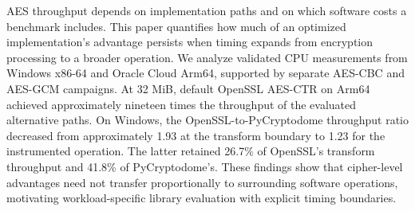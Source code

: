 AES throughput depends on implementation paths and on which software costs a benchmark includes. This paper quantifies how much of an optimized implementation's advantage persists when timing expands from encryption processing to a broader operation. We analyze validated CPU measurements from Windows x86-64 and Oracle Cloud Arm64, supported by separate AES-CBC and AES-GCM campaigns. At 32 MiB, default OpenSSL AES-CTR on Arm64 achieved approximately nineteen times the throughput of the evaluated alternative paths. On Windows, the OpenSSL-to-PyCryptodome throughput ratio decreased from approximately 1.93 at the transform boundary to 1.23 for the instrumented operation. The latter retained 26.7\% of OpenSSL's transform throughput and 41.8\% of PyCryptodome's. These findings show that cipher-level advantages need not transfer proportionally to surrounding software operations, motivating workload-specific library evaluation with explicit timing boundaries.
